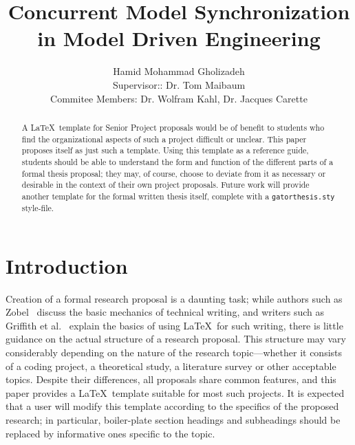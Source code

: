 \documentclass[11pt]{article}
\title{Concurrent Model Synchronization in Model Driven Engineering}
\author{Hamid Mohammad Gholizadeh \\ Supervisor::  Dr. Tom Maibaum \\
Commitee Members: Dr. Wolfram Kahl, Dr. Jacques Carette }
\begin{document}
\lstset{language=C++,basicstyle=\small,
        stringstyle=\ttfamily,showstringspaces=false}

\singlespace
\maketitle

\begin{abstract}                %
A \LaTeX\ template for Senior Project proposals would be of benefit to
students who find the organizational aspects of such a project
difficult or unclear.  This paper proposes itself as just such a
template.  Using this template as a reference guide, students should be
able to understand the form and function of the different parts of a
formal thesis proposal; they may, of course, choose to deviate from it
as necessary or desirable in the context of their own project
proposals.  Future work will provide another template for the formal written
thesis itself, complete with a {\tt gatorthesis.sty} style-file.
\end{abstract}

\doublespace
\setcounter{secnumdepth}{2}

\section{Introduction}\label{ch:overview}

Creation of a formal research proposal is a daunting task; while authors
such as Zobel~\cite{zobel:97} discuss the basic mechanics of technical
writing, and writers such as Griffith et al.~\cite{griffiths:97}
explain the basics of using \LaTeX\ for such writing, there is little
guidance on the actual structure of a research proposal.
This structure may vary considerably depending on the nature of the
research topic---whether it consists of a coding project, a theoretical
study, a literature survey or other acceptable topics.  Despite their
differences, all proposals share common features, and this paper provides
a \LaTeX\ template suitable for most such projects.  It is expected that
a user will modify this template according to the specifics of the
proposed research; in particular, boiler-plate section headings
and subheadings should be replaced by informative ones specific to
the topic.
\end{document}
